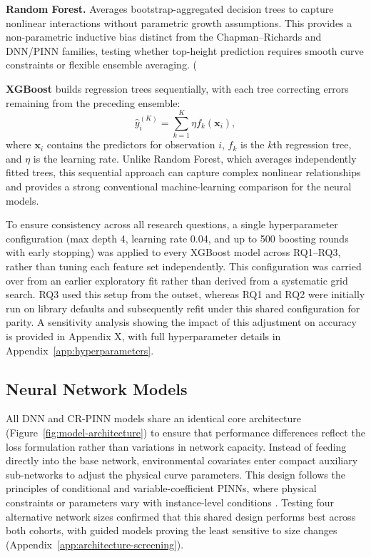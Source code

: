 \documentclass[11pt,a4paper]{report}
\begin{document}
\textbf{Random Forest.} Averages bootstrap-aggregated decision trees to capture nonlinear interactions without parametric growth assumptions. This provides a non-parametric inductive bias distinct from the Chapman--Richards and DNN/PINN families, testing whether top-height prediction requires smooth curve constraints or flexible ensemble averaging. (%

\textbf{XGBoost} builds regression trees sequentially, with each tree correcting errors remaining from the preceding ensemble:
\begin{equation}
\hat{y}_i^{(K)} = \sum_{k=1}^{K}\eta f_k(\mathbf{x}_i),
\end{equation}
where $\mathbf{x}_i$ contains the predictors for observation $i$, $f_k$ is the $k$th regression tree, and $\eta$ is the learning rate. Unlike Random Forest, which averages independently fitted trees, this sequential approach can capture complex nonlinear relationships and provides a strong conventional machine-learning comparison for the neural models.

To ensure consistency across all research questions, a single hyperparameter configuration (max depth 4, learning rate 0.04, and up to 500 boosting rounds with early stopping) was applied to every XGBoost model across RQ1–RQ3, rather than tuning each feature set independently. This configuration was carried over from an earlier exploratory fit rather than derived from a systematic grid search. RQ3 used this setup from the outset, whereas RQ1 and RQ2 were initially run on library defaults and subsequently refit under this shared configuration for parity. A sensitivity analysis showing the impact of this adjustment on accuracy is provided in Appendix X, with full hyperparameter details in Appendix~\ref{app:hyperparameters}. 

\subsection{Neural Network Models}
All DNN and CR-PINN models share an identical core architecture (Figure~\ref{fig:model-architecture}) to ensure that performance differences reflect the loss formulation rather than variations in network capacity. Instead of feeding directly into the base network, environmental covariates enter compact auxiliary sub-networks to adjust the physical curve parameters. This design follows the principles of conditional and variable-coefficient PINNs, where physical constraints or parameters vary with instance-level conditions \citep{kovacs2022Conditional_C4_NN,miao2023VCPINN_C4_NN}. Testing four alternative network sizes confirmed that this shared design performs best across both cohorts, with guided models proving the least sensitive to size changes (Appendix~\ref{app:architecture-screening}).
\end{document}
